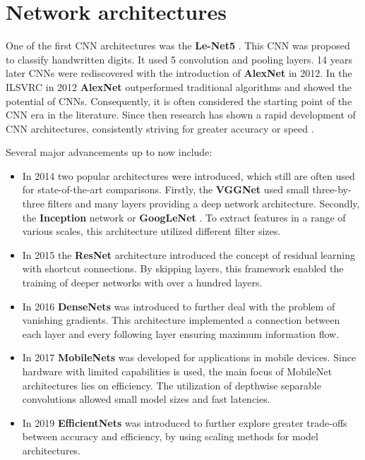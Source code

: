 \section{Network architectures}
\label{sec:networkArchitectures}

One of the first CNN architectures was the \textbf{Le-Net5} \cite{LeNet5}.
This CNN was proposed to classify handwritten digits.
It used 5 convolution and pooling layers.
14 years later CNNs were rediscovered with the introduction of \textbf{AlexNet} \cite{AlexNet2012} in 2012.
In the \ac{ILSVRC} \cite{ILSVRC15} in 2012 \textbf{AlexNet} outperformed traditional algorithms and showed the potential of CNNs.
Consequently, it is often considered the starting point of the CNN era in the literature.
Since then research has shown a rapid development of CNN architectures, consistently striving for greater accuracy or speed \cite{networkArchitectureSurvey}.

\vspace{1cm} %

\noindent Several major advancements up to now include:

\begin{itemize}
    \item In 2014 two popular architectures were introduced, which still are often used for state-of-the-art comparisons. Firstly, the \textbf{\ac{VGGNet}} \cite{VGGNet2015} used small three-by-three filters and many layers providing a deep network architecture. Secondly, the \textbf{Inception} network or \textbf{GoogLeNet} \cite{InceptionNet}. To extract features in a range of various scales, this architecture utilized different filter sizes.
    \item In 2015 the \textbf{ResNet} architecture \cite{ResNet} introduced the concept of residual learning with shortcut connections. By skipping layers, this framework enabled the training of deeper networks with over a hundred layers.
    \item In 2016 \textbf{DenseNets} \cite{DenseNets} was introduced to further deal with the problem of vanishing gradients. This architecture implemented a connection between each layer and every following layer ensuring maximum information flow.
    \item In 2017 \textbf{MobileNets} \cite{MobileNetV1} \cite{MobileNetV2} \cite{MobileNetV3} was developed for applications in mobile devices. Since hardware with limited capabilities is used, the main focus of MobileNet architectures lies on efficiency. The utilization of depthwise separable convolutions allowed small model sizes and fast latencies.
    \item In 2019 \textbf{EfficientNets} \cite{EfficientNet} was introduced to further explore greater trade-offs between accuracy and efficiency, by using scaling methods for model architectures. 
\end{itemize}


